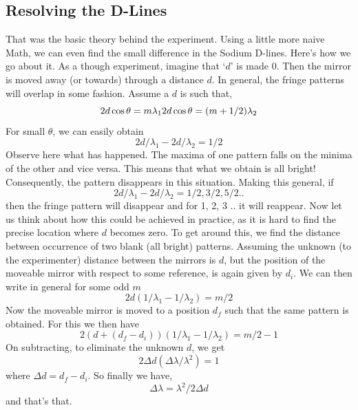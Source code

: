 	\subsection{Resolving the D-Lines}
		That was the basic theory behind the experiment. Using a little more naive Math, we can even find the small difference in the Sodium D-lines. Here's how we go about it. As a though experiment, imagine that `$d$' is made 0. Then the mirror is moved away (or towards) through a distance $d$. In general, the fringe patterns will overlap in some fashion. Assume a $d$ is such that,
		\begin{equation}
			2d\cos{\theta}=m\lambda_1 \\
			2d\cos{\theta}=(m+1/2)\lambda_2
		\end{equation}
		For small $\theta$, we can easily obtain
		\begin{equation}
			2d/\lambda_1 - 2d/\lambda_2 = 1/2
		\end{equation}
		Observe here what has happened. The maxima of one pattern falls on the minima of the other and vice versa. This means that what we obtain is all bright! Consequently, the pattern disappears in this situation. Making this general, if
		\begin{equation}
			2d/\lambda_1 - 2d/\lambda_2 = 1/2, 3/2, 5/2 ..
		\end{equation}
		then the fringe pattern will disappear and for 1, 2, 3 .. it will reappear. 
		Now let us think about how this could be achieved in practice, as it is hard to find the precise location where $d$ becomes zero. To get around this, we find the distance between occurrence of two blank (all bright) patterns. Assuming the unknown (to the experimenter) distance between the mirrors is $d$, but the position of the moveable mirror with respect to some reference, is again given by $d_i$. We can then write in general for some odd $m$
		\begin{equation}
			2d (1/\lambda_1 - 1/\lambda_2) = m/2
		\end{equation}
		Now the moveable mirror is moved to a position $d_f$ such that the same pattern is obtained. For this we then have
		\begin{equation}
			2(d+(d_f-d_i)) (1/\lambda_1 - 1/\lambda_2) = m/2 - 1
		\end{equation}
		On subtracting, to eliminate the unknown $d$, we get
		\begin{equation}
			2\Delta d (\Delta \lambda / \lambda^2) = 1
		\end{equation}
		where $\Delta d = d_f - d_i$. So finally we have,
		\begin{equation}
			\Delta \lambda = \lambda^2/2\Delta d
		\end{equation}
		and that's that.

